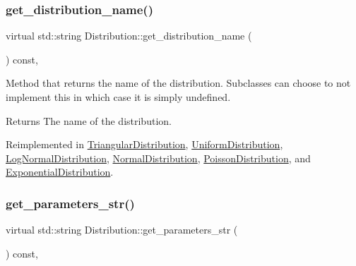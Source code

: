 \mbox{\label{classDistribution_a478a0c7b72d3ad266a2b6f1b9ed20fe9}} 
\subsubsection{\texorpdfstring{get\+\_\+distribution\+\_\+name()}{get\_distribution\_name()}}
{\footnotesize\ttfamily virtual std\+::string Distribution\+::get\+\_\+distribution\+\_\+name (\begin{DoxyParamCaption}{ }\end{DoxyParamCaption}) const\hspace{0.3cm}{\ttfamily [inline]}, {\ttfamily [virtual]}}

Method that returns the name of the distribution. Subclasses can choose to not implement this in which case it is simply undefined. \begin{DoxyReturn}{Returns}
The name of the distribution. 
\end{DoxyReturn}


Reimplemented in \hyperlink{classTriangularDistribution_ae9ceb04d07ea5f9dd9390ec62a7d0849}{Triangular\+Distribution}, \hyperlink{classUniformDistribution_a41a9a47839d15e67d5e2432f983ed382}{Uniform\+Distribution}, \hyperlink{classLogNormalDistribution_a05e474accd65f523749011fbc8b42b65}{Log\+Normal\+Distribution}, \hyperlink{classNormalDistribution_a13afb9f11a9d643ff1af5de2ca066005}{Normal\+Distribution}, \hyperlink{classPoissonDistribution_a2c6ac9d330241badbdeadc065ad47c1e}{Poisson\+Distribution}, and \hyperlink{classExponentialDistribution_a98ac6f2df798ae19bc371a2f071e21bb}{Exponential\+Distribution}.

\mbox{\label{classDistribution_a716b7df9facb6bb016f46ac130297f9c}} 
\subsubsection{\texorpdfstring{get\+\_\+parameters\+\_\+str()}{get\_parameters\_str()}}
{\footnotesize\ttfamily virtual std\+::string Distribution\+::get\+\_\+parameters\+\_\+str (\begin{DoxyParamCaption}{ }\end{DoxyParamCaption}) const\hspace{0.3cm}{\ttfamily [inline]}, {\ttfamily [virtual]}}

